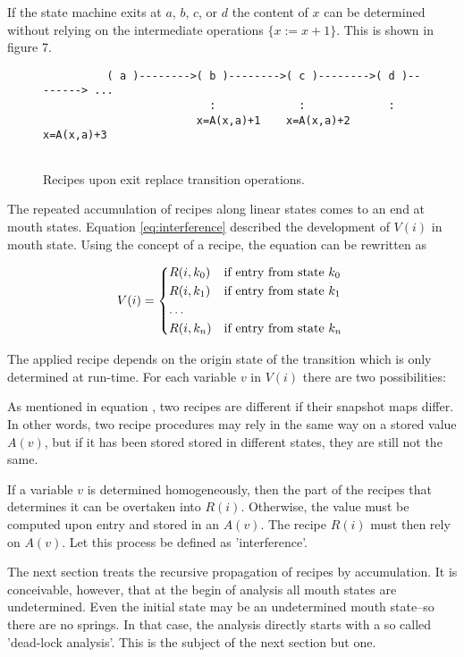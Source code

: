 \documentclass[12pt,a4paper]{scrartcl}
\begin{document}
If the state machine exits at $a$, $b$, $c$, or $d$ the content of $x$ can be
determined without relying on the intermediate operations $\{ x:=x+1 \}$. This
is shown in figure 7.
 
\begin{figure}[htbp] \leavevmode
\begin{verbatim}
          ( a )-------->( b )-------->( c )-------->( d )--------> ...
                          :             :             :
                        x=A(x,a)+1    x=A(x,a)+2    x=A(x,a)+3


\end{verbatim}
\caption{Recipes upon exit replace transition operations.}
\end{figure}

The repeated accumulation of recipes along linear states comes to an end at
mouth states.  Equation \eqref{eq:interference} described the development of
$V(i)$ in mouth state. Using the concept of a recipe, the equation can be
rewritten as

\begin{eqnarray}
    V(i)  =  \begin{dcases*}
               R(i,k_0) &  if entry from state $k_0$ \\
               R(i,k_1) &  if entry from state $k_1$ \\
               \dots                                 \\
               R(i,k_n) &  if entry from state $k_n$
            \end{dcases*}
\end{eqnarray}

The applied recipe depends on the origin state of the transition which is only
determined at run-time.  For each variable $v$ in $V(i)$ there are two
possibilities:


As mentioned in equation \label{eq:snapshot-map-difference}, two recipes are
different if their snapshot maps differ. In other words, two recipe procedures
may rely in the same way on a stored value $A(v)$, but if it has been stored
stored in different states, they are still not the same.

If a variable $v$ is determined homogeneously, then the part of the recipes
that determines it can be overtaken into $R(i)$. Otherwise, the value must be
computed upon entry and stored in an $A(v)$. The recipe $R(i)$ must then rely
on $A(v)$. Let this process be defined as 'interference'.


The next section treats the recursive propagation of recipes by accumulation.
It is conceivable, however, that at the begin of analysis all mouth states are
undetermined. Even the initial state may be an undetermined mouth state--so
there are no springs. In that case, the analysis directly starts with a so
called 'dead-lock analysis'. This is the subject of the next section but one.
\end{document}
